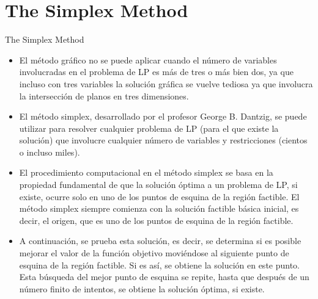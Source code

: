 
\section{The Simplex Method}


\begin{frame}{The Simplex Method}
  \begin{itemize} \parskip3mm \justifying
  \item<only@1>   El método gráfico no se puede aplicar cuando el número de variables involucradas en el problema de LP es más de tres o más bien dos, ya que incluso \alert{con tres variables la solución gráfica se vuelve tediosa} ya que involucra la intersección de planos en tres dimensiones.

  \item<only@1>   El método simplex, desarrollado por el profesor George B. Dantzig, se puede utilizar para resolver cualquier problema de LP (para el que existe la solución) que involucre cualquier número de variables y restricciones (cientos o incluso miles).
  
  \item<only@2>   El procedimiento computacional en el método simplex \alert{se basa en la propiedad fundamental de que la solución óptima a un problema de LP, si existe, ocurre solo en uno de los puntos de esquina de la región factible.} El método simplex siempre comienza con la solución factible básica inicial, es decir, el origen, que es uno de los puntos de esquina de la región factible.

  \item<only@2>   A continuación, se prueba esta solución, es decir, \alert{se determina si es posible mejorar el valor de la función objetivo moviéndose al siguiente punto de esquina de la región factible.} Si es así, se obtiene la solución en este punto. Esta búsqueda del mejor punto de esquina se repite, hasta que después de un número finito de intentos, se obtiene la solución óptima, si existe.
  \end{itemize}
\end{frame}


